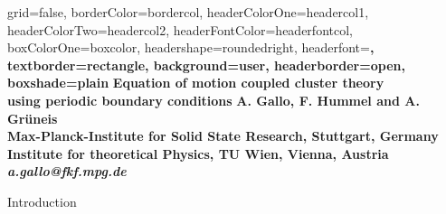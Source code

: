 \documentclass[a0paper,portrait]{baposter}
\begin{document}
\begin{poster}{
grid=false,
borderColor=bordercol, %
headerColorOne=headercol1, %
headerColorTwo=headercol2, %
headerFontColor=headerfontcol, %
boxColorOne=boxcolor, %
headershape=roundedright, %
headerfont=\Large\sf\bf, %
textborder=rectangle,
background=user,
headerborder=open, %
boxshade=plain
}
{}
{\sf\bf
  \hspace*{-1em}
  Equation of motion coupled cluster theory \\
  using periodic boundary conditions
} %
{\vspace{.2em}\bf A. Gallo, F. Hummel and A. Gr\"uneis\\ %
{\smaller\bf Max-Planck-Institute for Solid State Research, Stuttgart, Germany}\\  %
\vspace{-0.2em}
{\smaller\bf Institute for theoretical Physics, TU Wien, Vienna, Austria}\\  %
{\smaller\it a.gallo@fkf.mpg.de}  %
\vspace{-1cm}
}

\begin{posterbox}[ name=introduction,column=0,span=3,row=0.03 ]{Introduction}

  

\end{posterbox}

\def\posterImageSize{0.95}

\end{poster}
\end{document}
